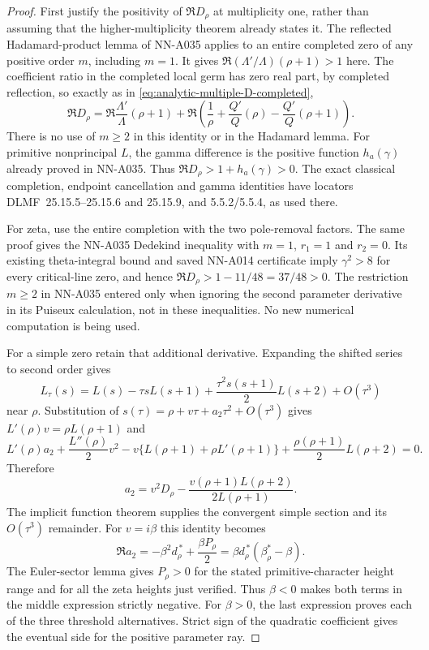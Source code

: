 \begin{proof}
First justify the positivity of $\Re D_\rho$ at multiplicity
one, rather than assuming that the higher-multiplicity theorem
already states it. The reflected Hadamard-product lemma
of NN-A035 applies to an entire completed zero of any positive
order $m$, including $m=1$. It gives
$\Re(\Lambda'/\Lambda)(\rho+1)>1$ here. The coefficient
ratio in the completed local germ has zero real part, by
completed reflection, so exactly as in
\eqref{eq:analytic-multiple-D-completed},
\[
 \Re D_\rho=\Re\frac{\Lambda'}{\Lambda}(\rho+1)
   +\Re\left(\frac1\rho+
           \frac{Q'}Q(\rho)-\frac{Q'}Q(\rho+1)\right).
\]
There is no use of $m\ge2$ in this identity or in the
Hadamard lemma. For primitive nonprincipal $L$, the gamma
difference is the positive function $h_a(\gamma)$ already
proved in NN-A035. Thus
$\Re D_\rho>1+h_a(\gamma)>0$.
The exact classical completion, endpoint cancellation and gamma
identities have locators DLMF~25.15.5--25.15.6 and 25.15.9,
and 5.5.2/5.5.4, as used there.

For zeta, use the entire completion with the two pole-removal
factors. The same proof gives the NN-A035 Dedekind inequality
with $m=1$, $r_1=1$ and $r_2=0$. Its existing theta-integral
bound and saved NN-A014 certificate imply $\gamma^2>8$ for
every critical-line zero, and hence
$\Re D_\rho>1-11/48=37/48>0$.
The restriction $m\ge2$ in NN-A035 entered only when ignoring
the second parameter derivative in its Puiseux calculation,
not in these inequalities. No new numerical computation is
being used.

For a simple zero retain that additional derivative. Expanding
the shifted series to second order gives
\[
 L_\tau(s)=L(s)-\tau sL(s+1)
                +\frac{\tau^2s(s+1)}2L(s+2)+O(\tau^3)
\]
near $\rho$. Substitution of
$s(\tau)=\rho+v\tau+a_2\tau^2+O(\tau^3)$ gives
$L'(\rho)v=\rho L(\rho+1)$ and
\[
 L'(\rho)a_2+\frac{L''(\rho)}2v^2
 -v\{L(\rho+1)+\rho L'(\rho+1)\}
 +\frac{\rho(\rho+1)}2L(\rho+2)=0.
\]
Therefore
\[
               a_2=v^2D_\rho
                   -\frac{v(\rho+1)L(\rho+2)}{2L(\rho+1)}.
\]
The implicit function theorem supplies the convergent simple
section and its $O(\tau^3)$ remainder. For $v=i\beta$ this
identity becomes
\begin{equation}\label{eq:A044-real-coefficient}
                   \Re a_2
                    =-\beta^2d_\rho^{\,*}+\frac{\beta P_\rho}{2}
                    =\beta d_\rho^{\,*}(\beta_\rho^*-\beta).
\end{equation}
The Euler-sector lemma gives $P_\rho>0$ for the stated
primitive-character height range and for all the zeta heights
just verified. Thus $\beta<0$ makes both terms in the
middle expression strictly negative. For $\beta>0$, the last
expression proves each of the three threshold alternatives.
Strict sign of the quadratic coefficient gives the eventual
side for the positive parameter ray.
\end{proof}

